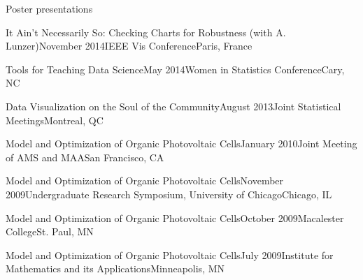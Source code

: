 \documentclass{resume} %
\begin{document}
\begin{rSection}{Poster presentations}

\begin{sSubsection}{It Ain't Necessarily So: Checking Charts for Robustness}{ (with A. Lunzer)}{November 2014}{IEEE Vis Conference}{Paris, France}
\end{sSubsection}

\begin{sSubsection}{Tools for Teaching Data Science}{}{May 2014}{Women in Statistics Conference}{Cary, NC}
\end{sSubsection}

\begin{sSubsection}{Data Visualization on the Soul of the Community}{}{August 2013}{Joint Statistical Meetings}{Montreal, QC}
\end{sSubsection}

\begin{sSubsection}{Model and Optimization of Organic Photovoltaic Cells}{}{January 2010}{Joint Meeting of AMS and MAA}{San Francisco, CA}
\end{sSubsection}

\begin{sSubsection}{Model and Optimization of Organic Photovoltaic Cells}{}{November 2009}{Undergraduate Research Symposium, University of Chicago}{Chicago, IL}
\end{sSubsection}

\begin{sSubsection}{Model and Optimization of Organic Photovoltaic Cells}{}{October 2009}{Macalester College}{St. Paul, MN}
\end{sSubsection}

\begin{sSubsection}{Model and Optimization of Organic Photovoltaic Cells}{}{July 2009}{Institute for Mathematics and its Applications}{Minneapolis, MN}
\end{sSubsection}
\end{rSection}

\end{document}
